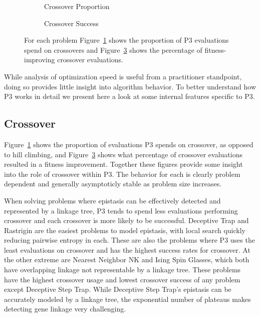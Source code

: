 \begin{figure}[t]
  \begin{centering}
    \begin{subfigure}{.5\textwidth}
      \begin{centering}
      \end{centering}
      \caption{Crossover Proportion}
      \label{fig-cross}
    \end{subfigure}%
    \begin{subfigure}{.5\textwidth}
      \begin{centering}
      \end{centering}
      \caption{Crossover Success}
      \label{fig-cross-success}
    \end{subfigure}
  \end{centering}
  \caption{For each problem Figure~\ref{fig-cross} shows the proportion of P3 evaluations spend on crossovers
           and Figure~\ref{fig-cross-success} shows the percentage of fitness-improving crossover evaluations.}
\end{figure}

While analysis of optimization speed is useful from a practitioner standpoint, doing so provides
little insight into algorithm behavior. To better understand how P3 works in detail we present here
a look at some internal features specific to P3.

\subsection{Crossover}
Figure~\ref{fig-cross} shows the proportion of evaluations P3 spends on crossover, as opposed to hill climbing,
and Figure~\ref{fig-cross-success} shows what percentage of crossover evaluations resulted in a fitness improvement.
Together these figures provide some insight into the role of crossover within P3. The behavior
for each is clearly problem dependent and generally asymptoticly stable as problem size increases.

When solving problems where epistasis can be effectively detected and represented by a linkage tree, P3 tends to spend
less evaluations performing crossover and each crossover is more likely to be successful.
Deceptive Trap and Rastrigin are the easiest problems to model epistasis, with local search quickly
reducing pairwise entropy in each. These are also the problems where P3 uses the least evaluations
on crossover and has the highest success rates for crossover. At the other extreme are Nearest Neighbor
NK and Ising Spin Glasses, which both have overlapping linkage not representable by a linkage tree.
These problems have the highest crossover usage and lowest crossover success of any problem except Deceptive
Step Trap.  While Deceptive Step Trap's epistasis can be accurately modeled by a linkage tree, the
exponential number of plateaus makes detecting gene linkage very challenging.

